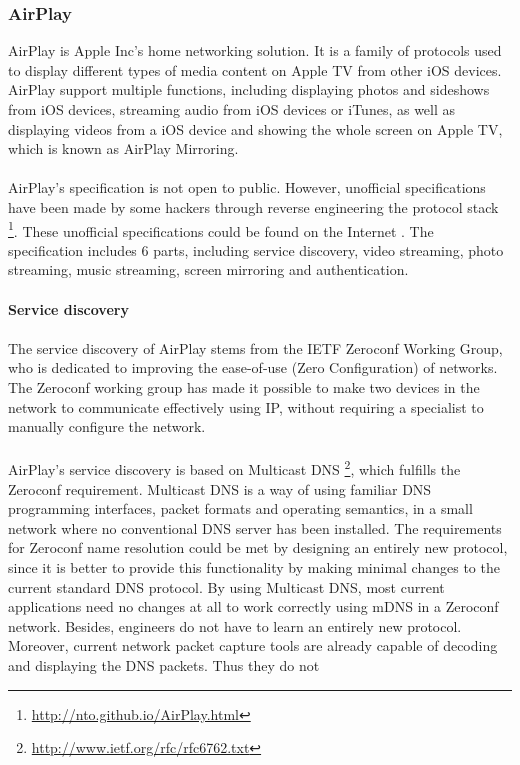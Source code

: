 \subsubsection{AirPlay} 
AirPlay is Apple Inc's home networking solution. It is a family of protocols 
used to display different types of media content on Apple TV from other iOS devices. 
AirPlay support multiple functions, including displaying photos and sideshows from iOS devices, streaming audio from iOS devices or iTunes, as well as displaying videos from a iOS device and 
showing the whole screen on Apple TV, which is known as AirPlay Mirroring. \\
\\
AirPlay's specification is not open to public. However, unofficial
specifications have been made by some hackers through reverse engineering the
protocol stack \footnote{\url{http://nto.github.io/AirPlay.html}}. These
unofficial specifications could be found on the Internet \cite{AirPlay-spec}.
The specification includes 6 parts, including service discovery, video
streaming, photo streaming, music streaming, screen mirroring and
authentication.\\
\\
\textbf{Service discovery} \\
\\ 
The service discovery of AirPlay stems from the IETF Zeroconf Working Group, 
who is dedicated to improving the ease-of-use (Zero Configuration) of networks. The 
Zeroconf working group has made it possible to make two devices in the 
network to communicate effectively using IP, without requiring a specialist to manually 
configure the network. \\
\\
AirPlay's service discovery is based on Multicast DNS \cite{multicastdns}
\footnote{\url{http://www.ietf.org/rfc/rfc6762.txt}}, which fulfills the
Zeroconf requirement. Multicast DNS is a way of using familiar DNS programming interfaces, packet formats and operating semantics, in a small 
network where no conventional DNS server has been installed. The requirements 
for Zeroconf name resolution could be met by designing an entirely new 
protocol, since it is better to provide this functionality by making minimal changes 
to the current standard DNS protocol. By using Multicast DNS, most current 
applications need no changes at all to work correctly using mDNS in a Zeroconf network. Besides,
engineers do not have to learn an entirely new protocol. Moreover, current network 
packet capture tools are already capable of  decoding and displaying the DNS packets. Thus they do not 
